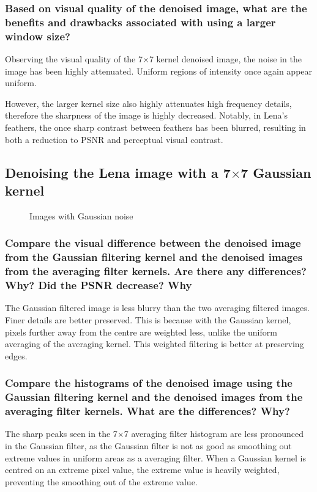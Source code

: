 \subsubsection{Based on visual quality of the denoised image, what are the benefits and drawbacks associated with using a larger window size?}
Observing the visual quality of the 7$\times$7 kernel denoised image, the noise in the image has been highly attenuated. Uniform regions of intensity once again appear uniform.

However, the larger kernel size also highly attenuates high frequency details, therefore the sharpness of the image is highly decreased. Notably, in Lena's feathers, the once sharp contrast between feathers has been blurred, resulting in both a reduction to PSNR and perceptual visual contrast.


\clearpage
\subsection{Denoising the Lena image with a 7$\times$7 Gaussian kernel}
\begin{figure}[ht]
\centering
	
	\caption{Images with Gaussian noise}
	\label{fig:gaussianNoise}
\end{figure}

\subsubsection{Compare the visual difference between the denoised image from the Gaussian filtering kernel and the denoised images from the averaging filter kernels. Are there any differences? Why? Did the PSNR decrease? Why}
The Gaussian filtered image is less blurry than the two averaging filtered images. Finer details are better preserved. This is because with the Gaussian kernel, pixels further away from the centre are weighted less, unlike the uniform averaging of the averaging kernel. This weighted filtering is better at preserving edges.


\subsubsection{Compare the histograms of the denoised image using the Gaussian filtering kernel and the denoised images from the averaging filter kernels. What are the differences? Why?}
The sharp peaks seen in the 7$\times$7 averaging filter histogram are less pronounced in the Gaussian filter, as the Gaussian filter is not as good as smoothing out extreme values in uniform areas as a averaging filter. When a Gaussian kernel is centred on an extreme pixel value, the extreme value is heavily weighted, preventing the smoothing out of the extreme value.

